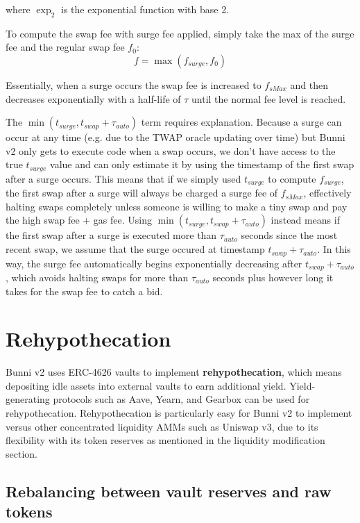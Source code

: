 \documentclass[twocolumn]{article}
\begin{document}
where $\exp_2$ is the exponential function with base 2.

To compute the swap fee with surge fee applied, simply take the max of the surge fee and the regular swap fee $f_0$:
\begin{equation}
  f = \max(f_{surge}, f_0) 
\end{equation}

Essentially, when a surge occurs the swap fee is increased to $f_{sMax}$ and then decreases exponentially with a half-life of $\tau$ until the normal fee level is reached.  

The $\min(t_{surge}, t_{swap} + \tau_{auto})$ term requires explanation. Because a surge can occur at any time (e.g. due to the TWAP oracle updating over time) but Bunni v2 only gets to execute code when a swap occurs, we don't have access to the true $t_{surge}$ value and can only estimate it by using the timestamp of the first swap after a surge occurs. This means that if we simply used $t_{surge}$ to compute $f_{surge}$, the first swap after a surge will always be charged a surge fee of $f_{sMax}$, effectively halting swaps completely unless someone is willing to make a tiny swap and pay the high swap fee + gas fee. Using $\min(t_{surge}, t_{swap} + \tau_{auto})$ instead means if the first swap after a surge is executed more than $\tau_{auto}$ seconds since the most recent swap, we assume that the surge occured at timestamp $t_{swap} + \tau_{auto}$. In this way, the surge fee automatically begins exponentially decreasing after $t_{swap} + \tau_{auto}$, which avoids halting swaps for more than $\tau_{auto}$ seconds plus however long it takes for the swap fee to catch a bid.

\section{Rehypothecation}

Bunni v2 uses ERC-4626\cite{ERC4626} vaults to implement \textbf{rehypothecation}, which means depositing idle assets into external vaults to earn additional yield. Yield-generating protocols such as Aave\cite{Aave}, Yearn\cite{Yearn}, and Gearbox\cite{Gearbox} can be used for rehypothecation. Rehypothecation is particularly easy for Bunni v2 to implement versus other concentrated liquidity AMMs such as Uniswap v3, due to its flexibility with its token reserves as mentioned in the liquidity modification section.

\subsection{Rebalancing between vault reserves and raw tokens}
\end{document}
